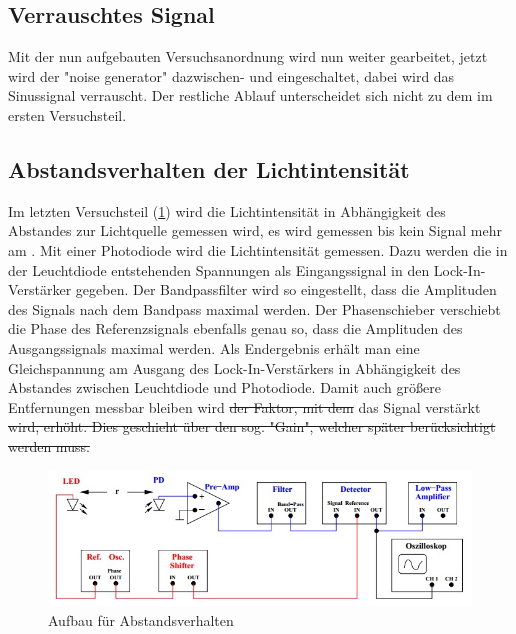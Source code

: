 \subsection{Verrauschtes Signal}

Mit der nun aufgebauten Versuchsanordnung wird nun weiter gearbeitet,
jetzt wird der "noise generator" dazwischen- und eingeschaltet, dabei wird das Sinussignal verrauscht. Der restliche Ablauf unterscheidet sich nicht zu dem im ersten Versuchsteil.

\subsection{Abstandsverhalten der Lichtintensität}

Im letzten Versuchsteil (\cref{fig:Aufbau2}) wird die Lichtintensität in Abhängigkeit des Abstandes zur Lichtquelle gemessen wird, es wird gemessen bis kein Signal mehr am  . Mit einer Photodiode wird die Lichtintensität gemessen. Dazu werden die in der Leuchtdiode entstehenden Spannungen als Eingangssignal in den Lock-In-Verstärker gegeben. Der Bandpassfilter wird so eingestellt, dass die Amplituden des Signals nach dem Bandpass maximal werden. Der Phasenschieber verschiebt die Phase des Referenzsignals ebenfalls genau so, dass die Amplituden des Ausgangssignals maximal werden. Als Endergebnis erhält man eine Gleichspannung am Ausgang des Lock-In-Verstärkers in Abhängigkeit des Abstandes zwischen Leuchtdiode und Photodiode. Damit auch größere Entfernungen messbar bleiben wird \sout{der Faktor, mit dem} das Signal verstärkt \sout{wird, erhöht. Dies geschieht über den sog. "Gain", welcher später berücksichtigt werden muss.}



\begin{figure}[h]
	\centering
	\includegraphics[scale=0.8]{Grafiken/V303Aufbau2.jpg}
	\caption{Aufbau für Abstandsverhalten}
	\label{fig:Aufbau2}
\end{figure}
